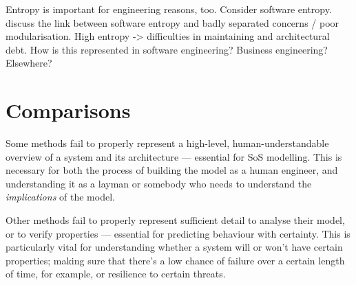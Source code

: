 Entropy is important for engineering reasons, too. Consider software entropy.
discuss the link between software entropy and badly separated concerns / poor modularisation.
High entropy -> difficulties in maintaining and architectural debt.
How is this represented in software engineering? Business engineering? Elsewhere?
\par


  

\section{Comparisons}

Some methods fail to properly represent a high-level, human-understandable overview of a system and its architecture --- essential for SoS modelling.
This is necessary for both the process of building the model as a human engineer, and understanding it as a layman or somebody who needs to understand the \emph{implications} of the model.
\par

Other methods fail to properly represent sufficient detail to analyse their model, or to verify properties --- essential for predicting behaviour with certainty.
This is particularly vital for understanding whether a system will or won't have certain properties; making sure that there's a low chance of failure over a certain length of time, for example, or resilience to certain threats.
\par

